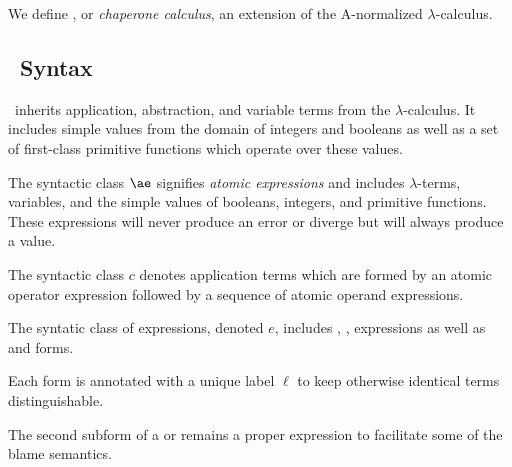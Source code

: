 \documentclass{sigplanconf}
\begin{document}
We define \chapcalc, or \emph{chaperone calculus}, an extension of the A-normalized $\lambda$-calculus.

\subsection{\chapcalc\ Syntax}


\chapcalc\ inherits application, abstraction, and variable terms from the $\lambda$-calculus.
It includes simple values from the domain of integers and booleans as well as a set of first-class primitive functions which operate over these values.

The syntactic class $\ae$ signifies \emph{atomic expressions} and includes $\lambda$-terms, variables, and the simple values of booleans, integers, and primitive functions. These expressions will never produce an error or diverge but will always produce a value.

The syntactic class $c$ denotes application terms which are formed by an atomic operator expression followed by a sequence of atomic operand expressions.

The syntatic class of expressions, denoted $e$, includes , ,  expressions as well as  and  forms.

Each  form is annotated with a unique label $\ell$ to keep otherwise identical terms distinguishable.

The second subform of a  or  remains a proper expression to facilitate some of the blame semantics.

\newcommand{\vx}[0]{\mathbf{x}}

\newcommand{\appe}[2]{(#1\,#2)}
\newcommand{\lame}[2]{(\lambda\,(#1)\,#2)}
\newcommand{\chae}[2]{(\mathrm{chaperone\mhyphen operator}\,#1\,#2)^\ell}
\newcommand{\impe}[2]{(\mathrm{impersonate\mhyphen operator}\,#1\,#2)}
\newcommand{\lete}[3]{(\mathrm{let}\,((#1)\,#2)\,#3)}
\newcommand{\letrece}[3]{(\mathrm{letrec}\,((#1)\,#2)\,#3)}
\newcommand{\ife}[3]{(\mathrm{if}\,#1\,#2\,#3)}

\newcommand{\ande}[2]{(\mathrm{and}\,#1\,#2)}
\newcommand{\ore}[2]{(\mathrm{or}\,#1\,#2)}

\newcommand{\true}[0]{\mathrm{\#t}}
\newcommand{\false}[0]{\mathrm{\#f}}
\end{document}
